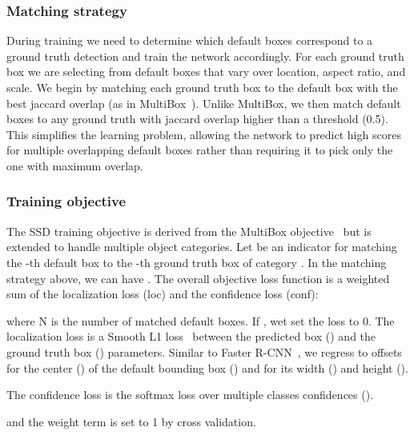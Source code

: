 \documentclass[runningheads]{llncs}
\begin{document}
\subsubsection{Matching strategy}
\label{sec:matchingstrategy}
During training we need to determine which default boxes correspond to a ground truth detection and train the network accordingly.  For each ground truth box we are selecting from default boxes that vary over location, aspect ratio, and scale. We begin by matching each ground truth box to the default box with the best jaccard overlap (as in MultiBox~\cite{erhan2014scalable}). Unlike MultiBox, we then match default boxes to any ground truth with jaccard overlap higher than a threshold (0.5). This simplifies the learning problem, allowing the network to predict high scores for multiple overlapping default boxes rather than requiring it to pick only the one with maximum overlap.

\subsubsection{Training objective}
\label{sec:trainingobjective}
The SSD training objective is derived from the MultiBox objective~\cite{erhan2014scalable,szegedy2014scalable} but is extended to handle multiple object categories. Let  be an indicator for matching the -th default box to the -th ground truth box of category .
In the matching strategy above, we can have .
The overall objective loss function is a weighted sum of the localization loss (loc) and the confidence loss (conf):

where N is the number of matched default boxes. If , wet set the loss to 0. The localization loss is a Smooth L1 loss~\cite{girshick2015fast} between the predicted box () and the ground truth box () parameters. Similar to Faster R-CNN~\cite{ren2015faster}, we regress to offsets for the center () of the default bounding box () and for its width () and height ().

The confidence loss is the softmax loss over multiple classes confidences ().

and the weight term  is set to 1 by cross validation.
\end{document}

